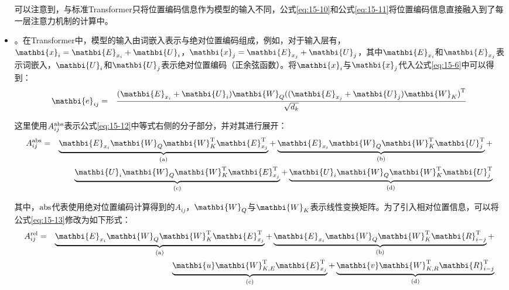 \begin{itemize}
\noindent 可以注意到，与标准Transformer只将位置编码信息作为模型的输入不同，公式\eqref{eq:15-10}和公式\eqref{eq:15-11}将位置编码信息直接融入到了每一层注意力机制的计算中。

\vspace{0.5em}
\item {\small{}}。在Transformer中，模型的输入由词嵌入表示与绝对位置编码组成，例如，对于输入层有，$\mathbi{x}_i = \mathbi{E}_{x_i} + \mathbi{U}_i$，$\mathbi{x}_j=\mathbi{E}_{x_j} + \mathbi{U}_j$，其中$\mathbi{E}_{x_i} $和$\mathbi{E}_{x_j} $表示词嵌入，$\mathbi{U}_i$和$\mathbi{U}_j$表示绝对位置编码（正余弦函数）。将$\mathbi{x}_i$与$\mathbi{x}_j$代入公式\eqref{eq:15-6}中可以得到：
\begin{eqnarray}
\mathbi{e}_{ij} &=& \frac{(\mathbi{E}_{x_i} + \mathbi{U}_i)\mathbi{W}_Q{((\mathbi{E}_{x_j} + \mathbi{U}_j)\mathbi{W}_K)}^{\textrm{T}}}{\sqrt{d_k}}
\label{eq:15-12}
\end{eqnarray}

\noindent 这里使用$A_{ij}^{\rm abs}$表示公式\eqref{eq:15-12}中等式右侧的分子部分，并对其进行展开：
\begin{eqnarray}
A_{ij}^{\rm abs} &=& \underbrace{\mathbi{E}_{x_i}\mathbi{W}_Q\mathbi{W}_{K}^{\textrm{T}}\mathbi{E}_{x_j}^{\textrm{T}}}_{\textrm{(a)}} + \underbrace{\mathbi{E}_{x_i}\mathbi{W}_Q\mathbi{W}_{K}^{\textrm{T}}\mathbi{U}_{j}^{\textrm{T}}}_{\textrm{(b)}} + \nonumber \\
& & \underbrace{\mathbi{U}_i\mathbi{W}_Q\mathbi{W}_{K}^{\textrm{T}}\mathbi{E}_{x_j}^{\textrm{T}}}_{\textrm{(c)}} + \underbrace{\mathbi{U}_i\mathbi{W}_Q\mathbi{W}_{K}^{\textrm{T}}\mathbi{U}_{j}^{\textrm{T}}}_{\textrm{(d)}}
\label{eq:15-13}
\end{eqnarray}

\noindent 其中，${\rm abs}$代表使用绝对位置编码计算得到的$A_{ij}$，$\mathbi{W}_Q$与$\mathbi{W}_K$表示线性变换矩阵。为了引入相对位置信息，可以将公式\eqref{eq:15-13}修改为如下形式：
\begin{eqnarray}
A_{ij}^{\rm rel} &=& \underbrace{\mathbi{E}_{x_i}\mathbi{W}_Q\mathbi{W}_{K}^{\textrm{T}}\mathbi{E}_{x_j}^{\textrm{T}}}_{\textrm{(a)}} + \underbrace{\mathbi{E}_{x_i}\mathbi{W}_Q\mathbi{W}_{K}^{\textrm{T}}\mathbi{R}_{i-j}^{\textrm{T}}}_{\textrm{(b)}} + \nonumber \\
& & \underbrace{\mathbi{u}\mathbi{W}_{K,E}^{\textrm{T}}\mathbi{E}_{x_j}^{\textrm{T}}}_{\textrm{(c)}} + \underbrace{\mathbi{v}\mathbi{W}_{K,R}^{\textrm{T}}\mathbi{R}_{i-j}^{\textrm{T}}}_{\textrm{(d)}}
\label{eq:15-14}
\end{eqnarray}


\end{itemize}
